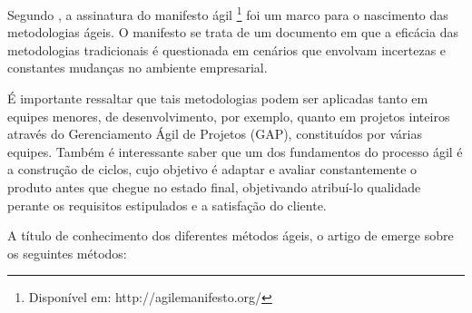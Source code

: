 Segundo , a assinatura do manifesto ágil \footnote{Disponível em: \textsf{http://agilemanifesto.org/}} foi um marco para o nascimento das metodologias ágeis. O manifesto se trata de um documento em que a eficácia das metodologias tradicionais é questionada em cenários que envolvam incertezas e constantes mudanças no ambiente empresarial. 

É importante ressaltar que tais metodologias podem ser aplicadas tanto em equipes menores, de desenvolvimento, por exemplo, quanto em projetos inteiros através do Gerenciamento Ágil de Projetos (GAP), constituídos por várias equipes. Também é interessante saber que um dos fundamentos do processo ágil é a construção de ciclos, cujo objetivo é adaptar e avaliar constantemente o produto antes que chegue no estado final, objetivando atribuí-lo qualidade perante os requisitos estipulados e a satisfação do cliente.

A título de conhecimento dos diferentes métodos ágeis, o artigo de  emerge sobre os seguintes métodos:

